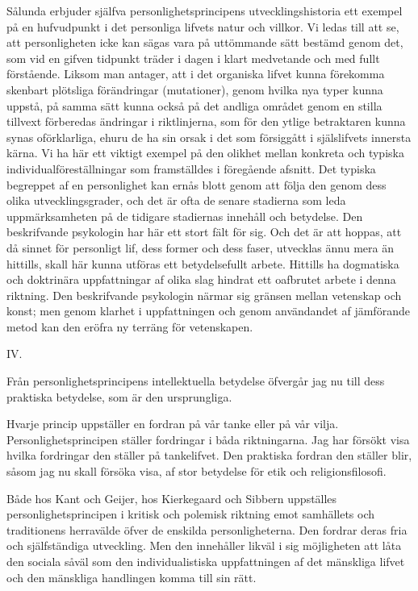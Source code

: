 \documentclass[12pt]{article}
\newcommand{\opage}[1]{\marginnote{\footnotesize\textit{[#1]}}}
\begin{document}
Sålunda erbjuder själfva personlighetsprincipens utvecklingshistoria ett exempel på en hufvudpunkt i det personliga lifvets natur och villkor. Vi ledas till att se, att personligheten icke kan sägas vara på uttömmande sätt bestämd genom det, som vid en gifven tidpunkt träder i dagen i klart medvetande och med fullt förstående. Liksom man antager, att i det organiska lifvet kunna förekomma skenbart plötsliga förändringar (mutationer), genom hvilka nya typer kunna %
\opage{38}
uppstå, på samma sätt kunna också på det andliga området genom en stilla tillvext förberedas ändringar i riktlinjerna, som för den ytlige betraktaren kunna synas oförklarliga, ehuru de ha sin orsak i det som försiggått i själslifvets innersta kärna. Vi ha här ett viktigt exempel på den olikhet mellan konkreta och typiska individualföreställningar som framställdes i föregående afsnitt. Det typiska begreppet af en personlighet kan ernås blott genom att följa den genom dess olika utvecklingsgrader, och det är ofta de senare stadierna som leda uppmärksamheten på de tidigare stadiernas innehåll och betydelse. Den beskrifvande psykologin har här ett stort fält för sig. Och det är att hoppas, att då sinnet för personligt lif, dess former och dess faser, utvecklas ännu mera än hittills, skall här kunna utföras ett betydelsefullt arbete. Hittills ha dogmatiska och doktrinära uppfattningar af olika slag hindrat ett oafbrutet arbete i denna riktning. Den beskrifvande psykologin närmar sig gränsen mellan vetenskap och konst; men genom klarhet i uppfattningen och genom användandet af jämförande metod kan den eröfra ny terräng för vetenskapen. %
\opage{39}
\begin{center}\large IV.\end{center}

Från personlighetsprincipens intellektuella betydelse öfvergår jag nu till dess praktiska betydelse, som är den ursprungliga.

Hvarje princip uppställer en fordran på vår tanke eller på vår vilja. Personlighetsprincipen ställer fordringar i båda riktningarna. Jag har försökt visa hvilka fordringar den ställer på tankelifvet. Den praktiska fordran den ställer blir, såsom jag nu skall försöka visa, af stor betydelse för etik och religionsfilosofi.

Både hos Kant och Geijer, hos Kierkegaard och Sibbern uppställes personlighetsprincipen i kritisk och polemisk riktning emot samhällets och traditionens herravälde öfver de enskilda personligheterna. Den fordrar deras fria och själfständiga utveckling. Men den innehåller likväl i sig möjligheten att låta den %
\opage{40}
sociala såväl som den individualistiska uppfattningen af det mänskliga lifvet och den mänskliga handlingen komma  till sin rätt.
\end{document}
